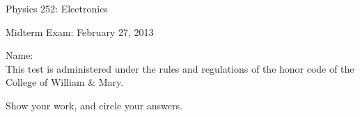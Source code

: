 \documentclass[letterpaper,addpoints,answers]{exam}
\begin{document}

\begin{coverpages}
 \large\bfseries
 
 \noindent 
 Physics 252: Electronics
 
 \vspace{2ex}
 \noindent
 Midterm Exam: February 27, 2013

 \vspace{5ex}
 \noindent 
 Name:\enspace\makebox[2in]{\hrulefill}\\

 \vspace{5ex}
 \noindent 
 This test is administered under the rules and regulations of the honor 
 code of the College of William \& Mary.  

 \vspace{5ex}
 \noindent 
 Show your work, and circle your answers.

 \vspace{5ex}
 \begin{center}
  \gradetable[v][questions]
 \end{center}
\end{coverpages}
 
\end{document}

